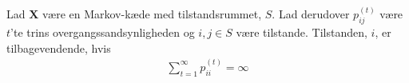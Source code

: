 
\begin{minipage}\textwidth
\begin{thmx}\label{tilbagevendende} \textbf{} %
\newline
Lad $\bm X$ være en Markov-kæde med tilstandsrummet, $S$. Lad derudover $p_{ij}^{(t)}$ være $t$'te trins overgangssandsynligheden og $i,j \in S$ være tilstande. Tilstanden, $i$, er tilbagevendende, hvis
\begin{align*}
 \sum_{t=1}^\infty p_{ii}^{(t)}=\infty
\end{align*}
\end{thmx}
\end{minipage}

